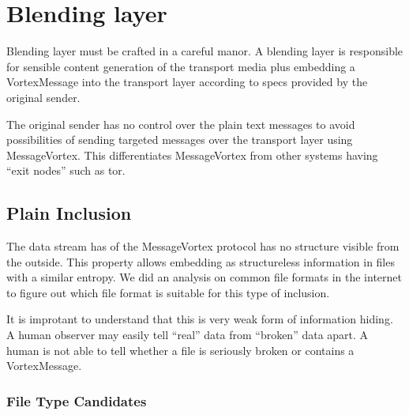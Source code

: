 



\section{Blending layer}
Blending layer must be crafted in a careful manor. A blending layer is responsible for sensible content generation of the transport media plus embedding a VortexMessage into the transport layer according to specs provided by the original sender.

The original sender has no control over the plain text messages to avoid possibilities of sending targeted messages over the transport layer using MessageVortex. This differentiates MessageVortex from other systems having ``exit nodes'' such as tor.


\subsection{Plain Inclusion}
The data stream has of the MessageVortex protocol has no structure visible from the outside. This property allows embedding as structureless information in files with a similar entropy. We did an analysis on common file formats in the internet to figure out which file format is suitable for this type of inclusion.

It is improtant to understand that this is very weak form of information hiding. A human observer may easily tell ``real'' data from ``broken'' data apart. A human is not able to tell whether a file is seriously broken or contains a VortexMessage.

\subsubsection{File Type Candidates}

